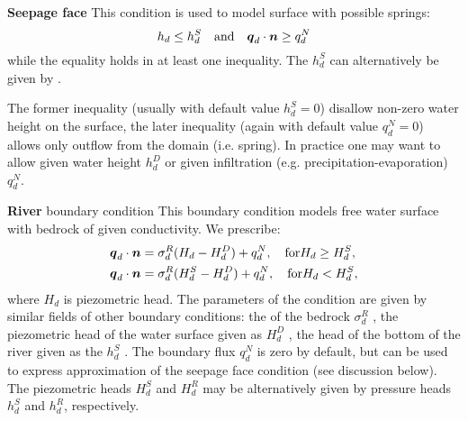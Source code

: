 
{\bf Seepage face} This condition is used to model surface with possible springs:
\[
    h_d \le h_d^S\quad \text{and} \quad \mathbf{\boldsymbol{q}}_d \cdot \mathbf{\boldsymbol{n}} \ge q_d^N
\]    
while the equality holds in at least one inequality. The  
$h_d^S$  can alternatively be given by .

The former inequality
(usually with default value $h_d^S=0$) disallow non-zero water height on the surface, the later
inequality (again with default value $q_d^N=0$) allows only outflow from the domain (i.e. spring).
In practice one may want to allow given water height $h_d^D$ or given infiltration (e.g. precipitation-evaporation) $q_d^N$.


{\bf River} boundary condition
This boundary condition models free water surface with bedrock of given conductivity. 
We prescribe:
\begin{align}
  \mathbf{\boldsymbol{q}}_d \cdot \mathbf{\boldsymbol{n}} &= \sigma_d^R ( H_d - H_d^D) + q_d^N, \quad \text{for} H_d \ge H_d^S,\\
  \mathbf{\boldsymbol{q}}_d \cdot \mathbf{\boldsymbol{n}} &= \sigma_d^R ( H_d^S - H_d^D)+q_d^N, \quad \text{for} H_d < H_d^S,
\end{align}
where $H_d$ is piezometric head.
The parameters of the condition are given by similar fields of other boundary conditions: 
the  of the bedrock $\sigma_d^R$ , 
the piezometric head of the water surface given as   $H_d^D$ ,
the head of the bottom of the river given as the  
$h_d^S$ . The boundary flux $q_d^N$ is zero by default, but can be used to express approximation of the seepage face condition 
(see discussion below).  The piezometric heads  $H_d^S$ and $H_d^R$ may be alternatively 
given by pressure heads $h_d^S$ and $h_d^R$, respectively.


